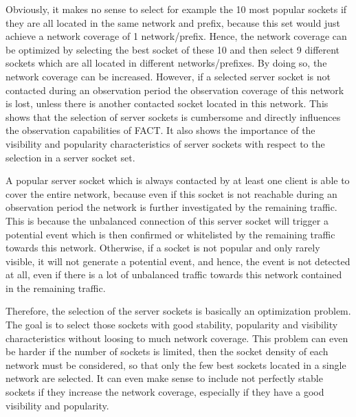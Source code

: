 Obviously, it makes no sense to select for example the 10 most popular sockets if they are all located in the same network and prefix, because this set would just achieve a network coverage of 1 network/prefix. 
Hence, the network coverage can be optimized by selecting the best socket of these 10 and then select 9 different sockets which are all located in different networks/prefixes. 
By doing so, the network coverage can be increased. However, if a selected  \gls{server socket} is not contacted during an observation period the observation coverage of this network is lost, unless there is another contacted socket located in this network. 
This shows that the selection of \glspl{server socket} is cumbersome and directly influences the observation capabilities of FACT. It also shows the importance of the visibility and popularity characteristics of \glspl{server socket} with respect to the selection in a \gls{server socket} set. 

A popular \gls{server socket} which is always contacted by at least one client is able to cover the entire network, because even if this socket is not reachable during an observation period the network is further investigated by the remaining traffic. 
This is because the unbalanced connection of this \gls{server socket} will trigger a potential event which is then confirmed or whitelisted by the  remaining traffic towards this network. 
Otherwise, if a socket is not popular and only rarely visible, it will not generate a potential event, and hence, the event is not detected at all, even if there is a lot of unbalanced traffic towards this network contained in the remaining traffic. 

Therefore, the selection of the \glspl{server socket} is basically an optimization problem. 
The goal is to select those sockets with good stability, popularity and visibility characteristics without loosing to much network coverage. 
This problem can even be harder if the number of sockets is limited, then the socket density of each network must be considered, so that only the few best sockets located in a single network are selected.
It can even make sense to include not perfectly 
stable sockets if they increase the network coverage, especially if they have a good visibility and popularity.
